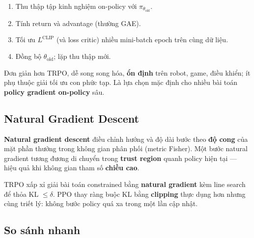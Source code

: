 \begin{phuongphap}[title={Quy trình PPO điển hình}]
\begin{enumerate}
  \item Thu thập tập kinh nghiệm on-policy với $\pi_{\theta_{\text{old}}}$.
  \item Tính return và advantage (thường GAE).
  \item Tối ưu $L^{\mathrm{CLIP}}$ (và loss critic) nhiều mini-batch epoch trên cùng dữ liệu.
  \item Đồng bộ $\theta_{\text{old}}$; lặp thu thập mới.
\end{enumerate}
\end{phuongphap}

\begin{tinhchat}[title={Vì sao PPO phổ biến}]
Đơn giản hơn TRPO, dễ song song hóa, \textbf{ổn định} trên robot, game, điều khiển; ít phụ thuộc giải tối ưu con phức tạp. Là lựa chọn mặc định cho nhiều bài toán \textbf{policy gradient on-policy} sâu.
\end{tinhchat}

\subsection{Natural Gradient Descent}

\begin{dinhnghia}[title={Natural gradient}]
\textbf{Natural gradient descent} điều chỉnh hướng và độ dài bước theo \textbf{độ cong} của mặt phần thưởng trong không gian phân phối (metric Fisher). Một bước natural gradient tương đương di chuyển trong \textbf{trust region} quanh policy hiện tại --- hiệu quả khi không gian tham số \textbf{chiều cao}.
\end{dinhnghia}

\begin{ynghia}[title={Liên hệ TRPO và natural gradient}]
TRPO xấp xỉ giải bài toán constrained bằng \textbf{natural gradient} kèm line search để thỏa KL $\leq \delta$. PPO thay ràng buộc KL bằng \textbf{clipping} thực dụng hơn nhưng cùng triết lý: không bước policy quá xa trong một lần cập nhật.
\end{ynghia}

\subsection{So sánh nhanh}

